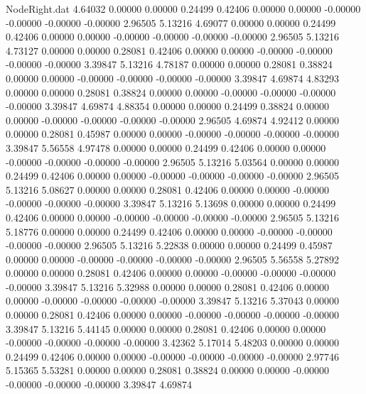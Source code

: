 \begin{filecontents}{NodeRight.dat}
   4.64032    0.00000    0.00000     0.24499    0.42406    0.00000    0.00000   -0.00000   -0.00000   -0.00000   -0.00000    2.96505    5.13216
   4.69077    0.00000    0.00000     0.24499    0.42406    0.00000    0.00000   -0.00000   -0.00000   -0.00000   -0.00000    2.96505    5.13216
   4.73127    0.00000    0.00000     0.28081    0.42406    0.00000    0.00000   -0.00000   -0.00000   -0.00000   -0.00000    3.39847    5.13216
   4.78187    0.00000    0.00000     0.28081    0.38824    0.00000    0.00000   -0.00000   -0.00000   -0.00000   -0.00000    3.39847    4.69874
   4.83293    0.00000    0.00000     0.28081    0.38824    0.00000    0.00000   -0.00000   -0.00000   -0.00000   -0.00000    3.39847    4.69874
   4.88354    0.00000    0.00000     0.24499    0.38824    0.00000    0.00000   -0.00000   -0.00000   -0.00000   -0.00000    2.96505    4.69874
   4.92412    0.00000    0.00000     0.28081    0.45987    0.00000    0.00000   -0.00000   -0.00000   -0.00000   -0.00000    3.39847    5.56558
   4.97478    0.00000    0.00000     0.24499    0.42406    0.00000    0.00000   -0.00000   -0.00000   -0.00000   -0.00000    2.96505    5.13216
   5.03564    0.00000    0.00000     0.24499    0.42406    0.00000    0.00000   -0.00000   -0.00000   -0.00000   -0.00000    2.96505    5.13216
   5.08627    0.00000    0.00000     0.28081    0.42406    0.00000    0.00000   -0.00000   -0.00000   -0.00000   -0.00000    3.39847    5.13216
   5.13698    0.00000    0.00000     0.24499    0.42406    0.00000    0.00000   -0.00000   -0.00000   -0.00000   -0.00000    2.96505    5.13216
   5.18776    0.00000    0.00000     0.24499    0.42406    0.00000    0.00000   -0.00000   -0.00000   -0.00000   -0.00000    2.96505    5.13216
   5.22838    0.00000    0.00000     0.24499    0.45987    0.00000    0.00000   -0.00000   -0.00000   -0.00000   -0.00000    2.96505    5.56558
   5.27892    0.00000    0.00000     0.28081    0.42406    0.00000    0.00000   -0.00000   -0.00000   -0.00000   -0.00000    3.39847    5.13216
   5.32988    0.00000    0.00000     0.28081    0.42406    0.00000    0.00000   -0.00000   -0.00000   -0.00000   -0.00000    3.39847    5.13216
   5.37043    0.00000    0.00000     0.28081    0.42406    0.00000    0.00000   -0.00000   -0.00000   -0.00000   -0.00000    3.39847    5.13216
   5.44145    0.00000    0.00000     0.28081    0.42406    0.00000    0.00000   -0.00000   -0.00000   -0.00000   -0.00000    3.42362    5.17014
   5.48203    0.00000    0.00000     0.24499    0.42406    0.00000    0.00000   -0.00000   -0.00000   -0.00000   -0.00000    2.97746    5.15365
   5.53281    0.00000    0.00000     0.28081    0.38824    0.00000    0.00000   -0.00000   -0.00000   -0.00000   -0.00000    3.39847    4.69874

\end{filecontents}

